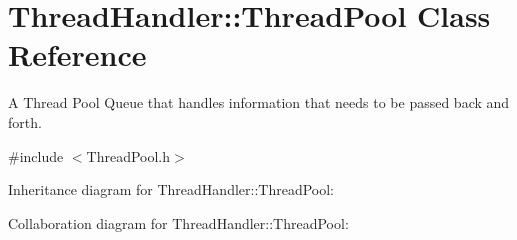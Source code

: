 \hypertarget{classThreadHandler_1_1ThreadPool}{}\section{Thread\+Handler\+::Thread\+Pool Class Reference}
\label{classThreadHandler_1_1ThreadPool}


A Thread Pool Queue that handles information that needs to be passed back and forth.  




{\ttfamily \#include $<$Thread\+Pool.\+h$>$}



Inheritance diagram for Thread\+Handler\+::Thread\+Pool\+:


Collaboration diagram for Thread\+Handler\+::Thread\+Pool\+:
